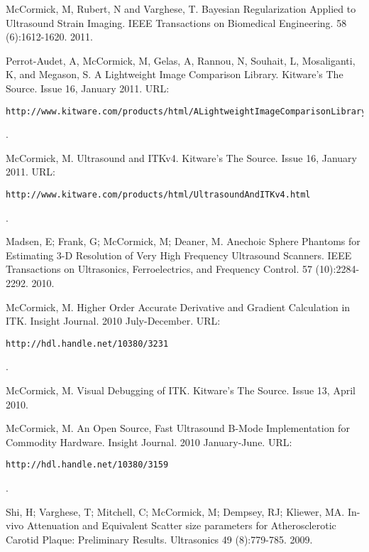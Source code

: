 \documentclass[margin,line]{res}
\begin{document}
\begin{resume}
McCormick, M, Rubert, N and Varghese, T.  Bayesian Regularization Applied to
Ultrasound Strain Imaging.  IEEE Transactions on Biomedical Engineering.
58 (6):1612-1620.  2011.

Perrot-Audet, A, McCormick, M, Gelas, A, Rannou, N, Souhait, L, Mosaliganti, K,
and Megason, S.  A Lightweight Image Comparison Library.  Kitware's The Source.
Issue 16, January 2011.
\vspace*{-.25in}
URL: \begin{verbatim}http://www.kitware.com/products/html/ALightweightImageComparisonLibrary.html\end{verbatim}.
\vspace*{-.35in}

McCormick, M.  Ultrasound and ITKv4.  Kitware's The Source.  Issue 16, January
2011.
\vspace*{-.25in}
URL: \begin{verbatim}http://www.kitware.com/products/html/UltrasoundAndITKv4.html\end{verbatim}.
\vspace*{-.35in}

Madsen, E; Frank, G; McCormick, M; Deaner, M.  Anechoic Sphere Phantoms for
Estimating 3-D Resolution of Very High Frequency Ultrasound Scanners.
IEEE Transactions on Ultrasonics, Ferroelectrics, and Frequency Control. 57
(10):2284-2292. 2010.

McCormick, M.  Higher Order Accurate Derivative and Gradient Calculation in ITK.
Insight Journal.  2010 July-December.
\vspace*{-.25in}
URL: \begin{verbatim}http://hdl.handle.net/10380/3231\end{verbatim}.
\vspace*{-.35in}

McCormick, M.  Visual Debugging of ITK.  Kitware's The Source.  Issue 13, April
2010.

McCormick, M.  An Open Source, Fast Ultrasound B-Mode Implementation for
Commodity Hardware.  Insight Journal.  2010 January-June.
\vspace*{-.25in}
URL: \begin{verbatim}http://hdl.handle.net/10380/3159\end{verbatim}.
\vspace*{-.35in}

Shi, H; Varghese, T; Mitchell, C; McCormick, M; Dempsey, RJ; Kliewer, MA.
In-vivo Attenuation and Equivalent Scatter size parameters for Atherosclerotic
Carotid Plaque: Preliminary Results.  Ultrasonics 49 (8):779-785.  2009.


\end{resume}
\end{document}
